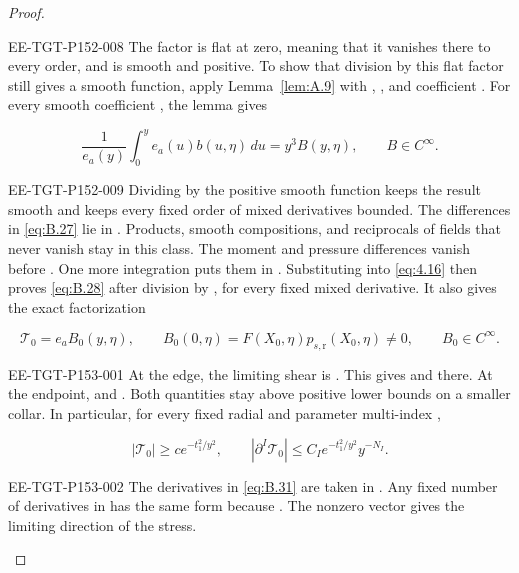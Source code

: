 \begin{proof}
\begin{EESegment}{EE-TGT-P152-008}
The factor  is flat at zero, meaning that it vanishes
there to every order, and  is smooth and positive. To show that division
by this flat factor still gives a smooth function, apply Lemma~\ref{lem:A.9} with
, , and coefficient
. For every smooth coefficient , the lemma gives
\end{EESegment}
\[
  \frac{1}{e_a(y)}\int_0^y e_a(u)b(u,\eta)\,du
  =y^3B(y,\eta),
  \qquad B\in C^\infty.
\]
\begin{EESegment}{EE-TGT-P152-009}
Dividing by the positive smooth function  keeps the result smooth and
keeps every fixed order of mixed derivatives bounded. The differences in \eqref{eq:B.27} lie in
. Products, smooth compositions, and reciprocals of fields that
never vanish stay in this class. The moment and pressure differences vanish before
. One more integration puts them in
. Substituting into \eqref{eq:4.16} then proves
\eqref{eq:B.28} after division by , for every fixed mixed derivative. It
also gives the exact factorization
\end{EESegment}
\begin{equation}
  \mathcal T_0=e_aB_0(y,\eta),
  \qquad
  B_0(0,\eta)=F(X_0,\eta)p_{s,\mathrm r}(X_0,\eta)\neq0,
  \qquad
  B_0\in C^\infty.
\tag{B.30}\label{eq:B.30}
\end{equation}
%
\begin{EESegment}{EE-TGT-P153-001}
At the edge, the limiting shear is . This gives
 and
 there. At the endpoint,
 and
. Both quantities stay
above positive lower bounds on a smaller collar. In particular, for every fixed radial and parameter
multi-index ,
\end{EESegment}
\begin{equation}
  |\mathcal T_0|\geq ce^{-t_1^2/y^2},
  \qquad
  |\partial^I\mathcal T_0|\leq C_Ie^{-t_1^2/y^2}y^{-N_I}.
\tag{B.31}\label{eq:B.31}
\end{equation}
\begin{EESegment}{EE-TGT-P153-002}
The derivatives in \eqref{eq:B.31} are taken in . Any fixed number
of derivatives in  has the same form because
. The nonzero vector
 gives the limiting direction of the stress.
\end{EESegment}


\end{proof}
